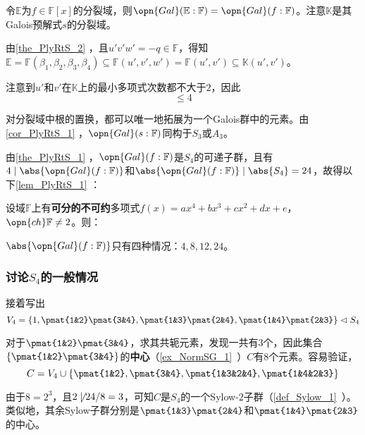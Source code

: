令$\mathbb{E}$为$f\in\mathbb{F}[x]$的分裂域，则$\opn{Gal}(\mathbb{E}:\mathbb{F})=\opn{Gal}(f:\mathbb{F})$。注意$\mathbb{K}$是其Galois预解式$s$的分裂域。

由\autoref{the_PlyRtS_2} ，且$u'v'w'=-q\in\mathbb{F}$，得知$\mathbb{E}=\mathbb{F}(\beta_1, \beta_2, \beta_3, \beta_4)\subseteq\mathbb{F}(u', v', w')=\mathbb{F}(u', v')\subseteq\mathbb{K}(u', v')$。

注意到$u'$和$v'$在$\mathbb{K}$上的最小多项式次数都不大于$2$，因此
\begin{equation}
[\mathbb{E}:\mathbb{K}]\leq 4
\end{equation}

对分裂域中根的置换，都可以唯一地拓展为一个Galois群中的元素。由\autoref{cor_PlyRtS_1} ，$\opn{Gal}(s:\mathbb{F})$同构于$S_3$或$A_3$。

由\autoref{the_PlyRtS_1} ，$\opn{Gal}(f:\mathbb{F})$是$S_4$的可递子群，且有$4\mid\abs{\opn{Gal}(f:\mathbb{F})}$和$\abs{\opn{Gal}(f:\mathbb{F})}\mid \abs{S_4}=24$，故得以下\autoref{lem_PlyRtS_1} ：

\begin{lemma}{}\label{lem_PlyRtS_1}
设域$\mathbb{F}$上有\textbf{可分的不可约}多项式$f(x)=ax^4+bx^3+cx^2+dx+e$，$\opn{ch}\mathbb{F}\neq 2$。则：

$\abs{\opn{Gal}(f:\mathbb{F})}$只有四种情况：$4, 8, 12, 24$。
\end{lemma}



\subsubsection{讨论$S_4$的一般情况}




接着写出
\begin{equation}
V_4=\{1, \pmat{1&2}\pmat{3&4}, \pmat{1&3}\pmat{2&4}, \pmat{1&4}\pmat{2&3}\}\vartriangleleft S_4
\end{equation}

对于$\pmat{1&2}\pmat{3&4}$，求其共轭元素，发现一共有$3$个，因此集合$\{\pmat{1&2}\pmat{3&4}\}$的\textbf{中心}（\autoref{ex_NormSG_1}~）$C$有$8$个元素。容易验证，
\begin{equation}\label{eq_PlyRtS_10}
C = V_4\cup\{\pmat{1&2}, \pmat{3&4}, \pmat{1&3&2&4}, \pmat{1&4&2&3}\}
\end{equation}

由于$8=2^3$，且$2\not\mid 24/8=3$，可知$C$是$S_4$的一个Sylow-$2$子群（\autoref{def_Sylow_1}~）。类似地，其余Sylow子群分别是$\pmat{1&3}\pmat{2&4}$和$\pmat{1&4}\pmat{2&3}$的中心。

